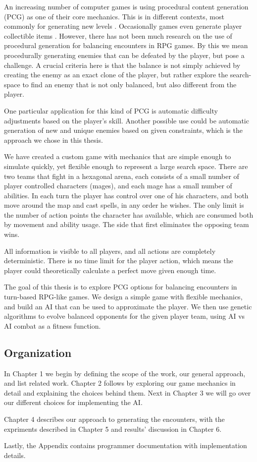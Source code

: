 
An increasing number of computer games is using procedural content generation
(PCG) as one of their core mechanics. This is in different contexts, most
commonly for generating new levels . Occasionally games
even generate player collectible items . However,
there has not been much research on the use of procedural generation for
balancing encounters in RPG games. By this we mean procedurally generating
enemies that can be defeated by the player, but pose a challenge. A crucial
criteria here is that the balance is not simply achieved by creating the enemy
as an exact clone of the player, but rather explore the search-space to find an
enemy that is not only balanced, but also different from the player.

One particular application for this kind of PCG is automatic difficulty
adjustments based on the player's skill. Another possible use could be
automatic generation of new and unique enemies based on given constraints,
which is the approach we chose in this thesis.

We have created a custom game with mechanics that are simple enough to simulate
quickly, yet flexible enough to represent a large search space. There are two
teams that fight in a hexagonal arena, each consists of a small number of
player controlled characters (mages), and each mage has a small number of
abilities. In each turn the player has control over one of his characters, and
both move around the map and cast spells, in any order he wishes. The only
limit is the number of action points the character has available, which are
consumed both by movement and ability usage. The side that first eliminates the
opposing team wins.

All information is visible to all players, and all actions are completely
deterministic. There is no time limit for the player action, which means the
player could theoretically calculate a perfect move given enough time.

The goal of this thesis is to explore PCG options for balancing encounters in
turn-based RPG-like games. We design a simple game with flexible mechanics, and
build an AI that can be used to approximate the player. We then use genetic
algorithms to evolve balanced opponents for the given player team, using AI vs
AI combat as a fitness function.

\subsection*{Organization}

In Chapter 1 we begin by defining the scope of the work, our general approach,
and list related work. Chapter 2 follows by exploring our game mechanics in
detail and explaining the choices behind them. Next in Chapter 3 we will go
over our different choices for implementing the AI.

Chapter 4 describes our approach to generating the encounters, with the expriments
described in Chapter 5 and results' discussion in Chapter 6.

Lastly, the Appendix contains programmer documentation with implementation
details.
